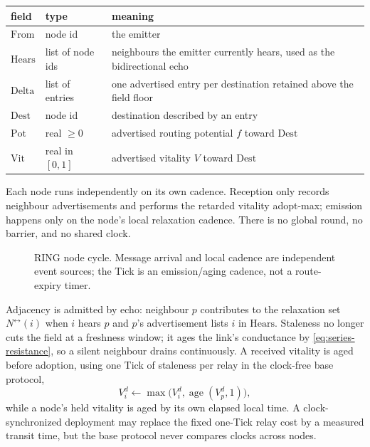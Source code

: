 \documentclass[11pt]{article}
\theoremstyle{plain}
\numberwithin{equation}{section}
\begin{document}
\begin{center}
\small
\begin{tabularx}{\textwidth}{>{\raggedright\arraybackslash}p{}p{}X}
\hline
\textbf{field} & \textbf{type} & \textbf{meaning} \\
\hline
$\mathrm{From}$ & node id & the emitter \\
$\mathrm{Hears}$ & list of node ids & neighbours the emitter currently hears, used as the bidirectional echo \\
$\mathrm{Delta}$ & list of entries & one advertised entry per destination retained above the field floor \\
$\mathrm{Dest}$ & node id & destination described by an entry \\
$\mathrm{Pot}$ & real $\ge0$ & advertised routing potential $f$ toward $\mathrm{Dest}$ \\
$\mathrm{Vit}$ & real in $[0,1]$ & advertised vitality $V$ toward $\mathrm{Dest}$ \\
\hline
\end{tabularx}
\end{center}

Each node runs independently on its own cadence.  Reception only records neighbour advertisements and
performs the retarded vitality adopt-max; emission happens only on the node's local relaxation cadence.
There is no global round, no barrier, and no shared clock.

\begin{figure}[t]
\centering

\caption{RING node cycle.  Message arrival and local cadence are independent event sources; the Tick is
an emission/aging cadence, not a route-expiry timer.}
\end{figure}

Adjacency is admitted by echo: neighbour $p$ contributes to the relaxation set
$N^{\leftrightarrow}(i)$ when $i$ hears $p$ and $p$'s advertisement lists $i$ in $\mathrm{Hears}$. Staleness
no longer cuts the field at a freshness window; it ages the link's conductance by \eqref{eq:series-resistance}, so a silent
neighbour drains continuously. A received vitality is aged before adoption,
using one Tick of staleness per relay in the clock-free base protocol,
\[
V^d_i \leftarrow \max\!\Big(V^d_i,\operatorname{age}(V^d_p,1)\Big),
\]
while a node's held vitality is aged by its own elapsed local time.  A clock-synchronized deployment may
replace the fixed one-Tick relay cost by a measured transit time, but the base protocol never compares
clocks across nodes.
\end{document}
